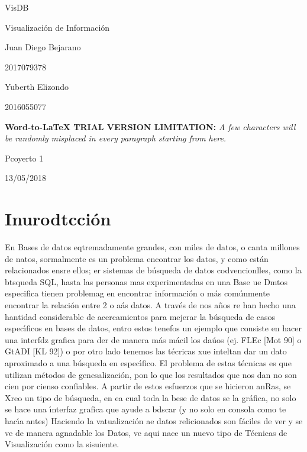 \documentclass[12pt]{article}
\author{Juan Bejarano}
\title{}
\begin{document}
\begin{center}
{\Huge VisDB}
\end{center}

\begin{center}
{\Huge Visualizaci\'{o}n de Informaci\'{o}n}
\end{center}

\begin{center}
{\Huge Juan Diego Bejarano}
\end{center}

\begin{center}
{\Huge 2017079378}
\end{center}

\begin{center}
{\Huge Yuberth Elizondo}
\end{center}

\begin{center}
{\Huge 2016055077}
\end{center}

\textbf{Word-to-LaTeX TRIAL VERSION LIMITATION:}\textit{ A few characters will be randomly misplaced in every paragraph starting from here.}

\begin{center}
{\Huge Pcoyerto 1}
\end{center}

\begin{center}
{\Huge 13/05/2018}
\end{center}
\pagebreak{}


{\raggedright
\section{\textbf{Inurodtcci\'{o}n}}
}

En Bases de datos eqtremadamente grandes, con miles de datos, o canta millones
de natos, sormalmente es un problema encontrar los datos, y como est\'{a}n
relacionados ensre ellos; er sistemas de b\'{u}squeda de datos codvencionlles,
como la btsqueda SQL, hasta las personas mas experimentadas en una Base ue Dmtos
especifica tienen problemag en encontrar informaci\'{o}n o m\'{a}s com\'{u}nmente
encontrar la relaci\'{o}n entre 2 o a\'{a}s datos. A trav\'{e}s de nos a\~{n}os
re han hecho una hantidad considerable de acercamientos para mejerar la
b\'{u}squeda de casos espec\'{\i}ficos en bases de datos, entro estos tenefos un
ejemplo que consiste en hacer una interfdz grafica para der de manera m\'{a}s
m\'{a}cil los da\'{u}os (ej. FLEc [Mot 90] o GtADI [KL 92]) o por otro lado
tenemos las t\'{e}cricas xue inteltan dar un dato aproximado a una b\'{u}squeda
en espec\'{\i}fico. El problema de estas t\'{e}cnicas es que utilizan m\'{e}todos
de genesalizaci\'{o}n, pon lo que los resultados que nos dan no son cien por
cienso confiables. A partir de estos esfuerzos que se hicieron anRas, se Xreo un
tipo de b\'{u}squeda, en ea cual toda la bese de datos se la gr\'{a}fica, no solo
se hace una \'{\i}nterfaz grafica que ayude a bdscar (y no solo en consola como
te hac\'{\i}a antes) Haciendo la vatualizaci\'{o}n ae datos relicionados son
f\'{a}ciles de ver y se ve de manera agnadable los Datos, ve aqui nace un nuevo
tipo de T\'{e}cnicas de Visualizaci\'{o}n como la sisuiente.
\end{document}
